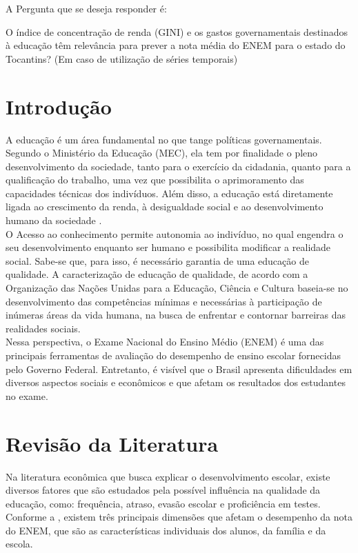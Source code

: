\documentclass[tcc1,project]{uftex}
\begin{document}
A Pergunta que se deseja responder é: 

O índice de concentração de renda (GINI) e os gastos governamentais destinados à educação têm relevância para prever a nota média do ENEM para o estado do Tocantins? (Em caso de utilização de séries temporais)\\

\section*{Introdução}

A educação é um área fundamental no que tange políticas governamentais. Segundo o Ministério da Educação (MEC), ela tem por finalidade o pleno desenvolvimento da sociedade, tanto para o exercício da cidadania, quanto para a qualificação do trabalho, uma vez que possibilita o aprimoramento das capacidades técnicas dos indivíduos. Além disso, a educação está diretamente ligada ao crescimento da renda, à desigualdade social e ao desenvolvimento humano da sociedade \cite{de2021determinantes}.\\

O Acesso ao conhecimento permite autonomia ao indivíduo, no qual engendra o seu desenvolvimento enquanto ser humano e possibilita modificar a realidade social. Sabe-se que, para isso, é necessário garantia de uma educação de qualidade. A caracterização de educação de qualidade, de acordo com a Organização das Nações Unidas para a Educação, Ciência e Cultura baseia-se no desenvolvimento das competências mínimas e necessárias à participação de inúmeras áreas da vida humana, na busca de enfrentar e contornar barreiras das realidades sociais. \cite{deanalise} \\

Nessa perspectiva, o Exame Nacional do Ensino Médio (ENEM) é uma das principais ferramentas de avaliação do desempenho de ensino escolar fornecidas pelo Governo Federal. Entretanto, é visível que o Brasil apresenta dificuldades em diversos aspectos sociais e econômicos e que afetam os resultados dos estudantes no exame.\\

\section*{Revisão da Literatura}

Na literatura econômica que busca explicar o desenvolvimento escolar, existe diversos fatores que são estudados pela possível influência na qualidade da educação, como: frequência, atraso, evasão escolar e proficiência em testes. Conforme a , existem três principais dimensões que afetam o desempenho da nota do ENEM, que são as características individuais dos alunos, da família e da escola. \\
\end{document}
